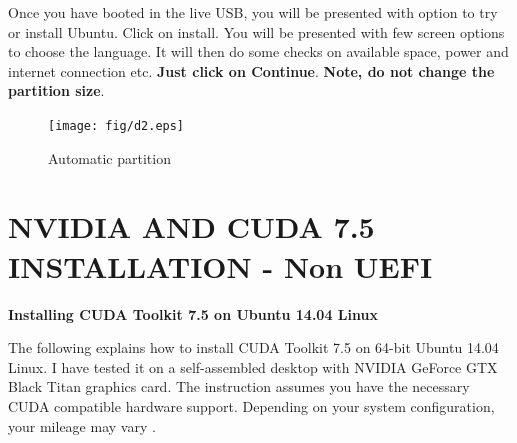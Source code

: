 \documentclass[12pt]{article}
\begin{document}
Once you have booted in the live USB, you will be presented with option to try or install Ubuntu. Click on install. You will be presented with few screen options to choose the language. It will then do some checks on available space, power and internet connection etc. \textbf{Just click on Continue}. \textbf{Note, do not change the partition size}.
\begin{figure}[h]
\centering \texttt{[image: fig/d2.eps]}
\caption{Automatic partition}
\end{figure}

\newpage


\section{NVIDIA AND CUDA 7.5 INSTALLATION - Non UEFI}

\textbf{Installing CUDA Toolkit 7.5 on Ubuntu 14.04 Linux}

The following explains how to install CUDA Toolkit 7.5 on 64-bit Ubuntu 14.04 Linux. I have tested it on a self-assembled desktop with NVIDIA GeForce GTX Black Titan graphics card. The instruction assumes you have the necessary CUDA compatible hardware support. Depending on your system configuration, your mileage may vary \cite{NVIDIADRIVER}.
\end{document}

